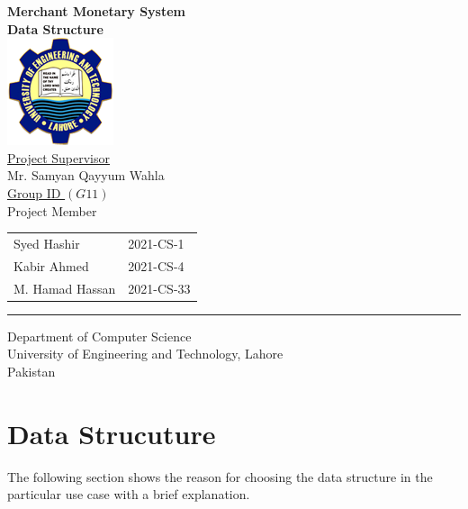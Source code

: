 \documentclass[12pt,a4paper]{report}
\begin{document}
\thispagestyle{empty}
\begin{center}
\textbf{\large{Merchant Monetary System}}\\
\vspace{0.5cm}
\textbf{ Data Structure} \\
\vspace{1.5cm}
\includegraphics[scale=.07]{UETLogo}\\
\vspace{1.5cm}
\underline{ Project Supervisor}\\
\vspace{0.5cm}
Mr. Samyan Qayyum Wahla\\
\vspace{1cm}
\underline {Group ID $(G 11)$} \\
\vspace{0.5cm}
Project Member\\
\vspace{0.5cm}
\begin{tabular}{ m{5cm} m{4cm}}
 Syed Hashir & 2021-CS-1 \\ 
 Kabir Ahmed & 2021-CS-4  \\  
 M. Hamad Hassan & 2021-CS-33
\end{tabular}
\vspace{2cm}
\par\rule{\textwidth}{0.5pt} 
Department of Computer Science\\
University of Engineering and Technology, Lahore\\
Pakistan
\end{center}
\newpage
\chapter*{Data Strucuture}
The following section shows the reason for choosing the data structure in the particular use case with a brief explanation.
\end{document}
